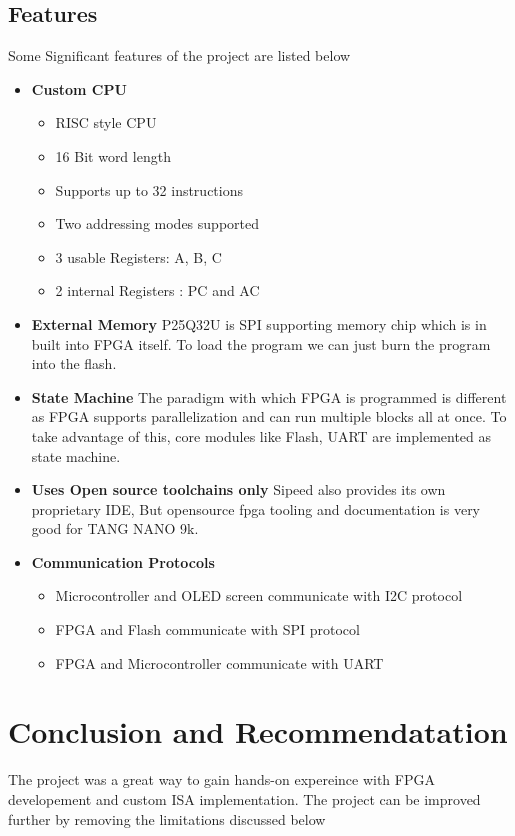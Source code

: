 \documentclass[a4paper,12pt]{article}
\begin{document}
    \subsection{Features}
    Some Significant features of the project are listed below

    \begin{itemize}
        \item \textbf{Custom CPU}
        \begin{itemize}
            \item RISC style CPU  
            \item 16 Bit word length 
            \item Supports up to 32 instructions
            \item Two addressing modes supported  
            \item 3 usable Registers: A, B, C
            \item 2 internal Registers : PC and AC  
        \end{itemize}
        \item \textbf{External Memory} P25Q32U is SPI supporting memory chip which is in built into FPGA itself. To load the program we can just burn the program into the flash. 
        \item \textbf{State Machine} The paradigm with which FPGA is programmed is different as FPGA supports parallelization and can run multiple blocks all at once. To take advantage of this, core modules like Flash, UART are implemented as state machine.
        \item \textbf{Uses Open source toolchains only} Sipeed also provides its own proprietary IDE, But opensource fpga tooling and documentation is very good for TANG NANO 9k. 
        \item \textbf{Communication Protocols}
        \begin{itemize}
            \item Microcontroller and OLED screen communicate with I2C protocol 
            \item FPGA and Flash communicate with SPI protocol
            \item FPGA and Microcontroller communicate with UART  
        \end{itemize}
    \end{itemize}
    \newpage
    \section{Conclusion and Recommendatation}
    The project was a great way to gain hands-on expereince with FPGA developement and custom ISA implementation. The project can be improved further by removing the limitations discussed below
\end{document}

